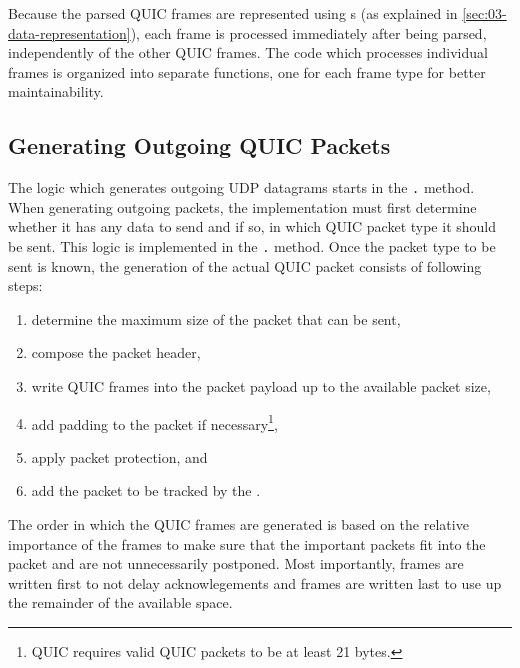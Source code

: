Because the parsed QUIC frames are represented using s (as explained in
\autoref{sec:03-data-representation}), each frame is processed immediately after being parsed,
independently of the other QUIC frames. The code which processes individual frames is organized
into separate functions, one for each frame type for better maintainability.

\subsection{Generating Outgoing QUIC Packets}


The logic which generates outgoing UDP datagrams starts in the
\texttt{\ManagedQuicConnection{}.} method. When generating outgoing packets, the
implementation must first determine whether it has any data to send and if so, in which QUIC packet
type it should be sent. This logic is implemented in the
\texttt{\ManagedQuicConnection{}.} method. Once the packet type to be sent is
known, the generation of the actual QUIC packet consists of following steps:

\begin{enumerate}

  \item determine the maximum size of the packet that can be sent,

  \item compose the packet header,

  \item write QUIC frames into the packet payload up to the available packet size,

  \item add padding to the packet if necessary\footnote{QUIC requires valid QUIC packets to be at least 21 bytes.},

  \item apply packet protection, and

  \item add the packet to be tracked by the \RecoveryController{}.

\end{enumerate}

The order in which the QUIC frames are generated is based on the relative importance of the frames
to make sure that the important packets fit into the packet and are not unnecessarily postponed.
Most importantly, \ACK{} frames are written first to not delay acknowlegements and \STREAM{} frames
are written last to use up the remainder of the available space.

